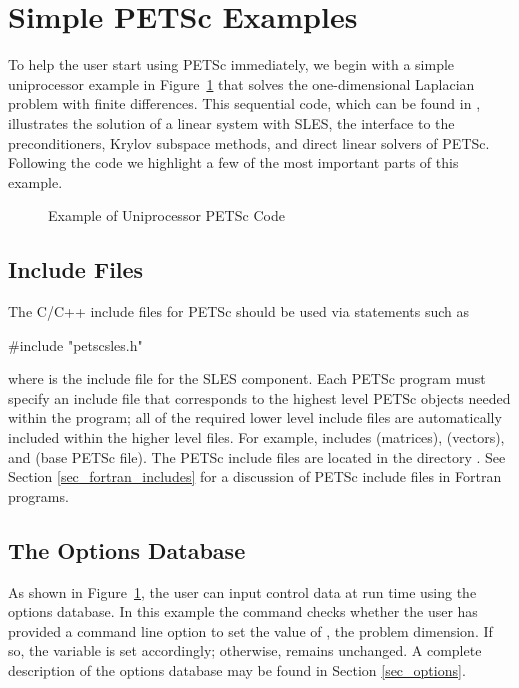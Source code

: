 \section{Simple PETSc Examples}

\label{sec_simple}

To help the user start using PETSc immediately, we begin with a simple
uniprocessor example in Figure~\ref{fig_example1} that solves the
one-dimensional Laplacian problem with finite differences.  This
sequential code, which can be found in 
,
illustrates the solution of a linear system with SLES, the 
interface to the preconditioners, Krylov subspace methods, and direct
linear solvers of PETSc.  Following the code we highlight a few of the most important
parts of this example.  

\begin{figure}[H]
{\footnotesize
{}
}
\caption{Example of Uniprocessor PETSc Code}
\label{fig_example1}
\end{figure}

\subsection*{Include Files}

The C/C++ include files for PETSc should be used via statements such as
\begin{tabbing}
   \#include "petscsles.h"
\end{tabbing}
where  is the include file for the SLES component.
Each PETSc program must specify an
include file that corresponds to the highest level PETSc objects
needed within the program; all of the required lower level include
files are automatically included within the higher level files.  For
example,  includes  (matrices),
 (vectors), and  (base PETSc file).  
The PETSc include files are located in the directory 
.  See Section \ref{sec_fortran_includes}
for a discussion of PETSc include files in Fortran programs.

\subsection*{The Options Database}

As shown in Figure~\ref{fig_example1}, the user can input control data
at run time using the options database. In this example the command
 checks whether the user has
provided a command line option to set the value of , the
problem dimension.  If so, the variable  is set accordingly;
otherwise,  remains unchanged. A complete description of the
options database may be found in Section \ref{sec_options}.

